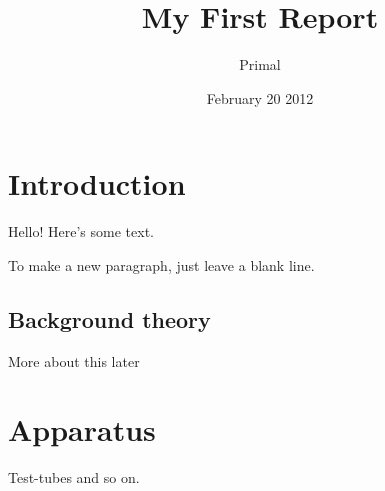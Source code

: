 \documentclass{article} %
\title{My First Report}
\author{Primal}
\date{February 20 2012}
\begin{document}
\maketitle %

\section{Introduction}
Hello!  Here's some text.

To make a new paragraph, just leave a blank line.

\subsection{Background theory}
More about this later

\section{Apparatus}
Test-tubes and so on.
\end{document}
